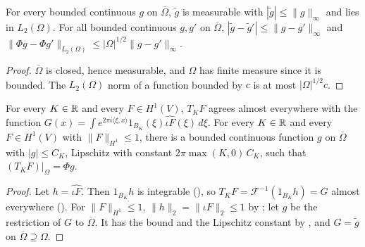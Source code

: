 \begin{lemma}
\label{lem:closure-extension}
\leanok
{}
For every bounded continuous $g$ on $\overline \Omega$, $\tilde g$ is measurable with
$|\tilde g| \leq \|g\|_\infty$ and lies in $L_2(\Omega)$. For all bounded continuous $g, g'$ on
$\overline \Omega$, $|\tilde g - \tilde g'| \leq \|g - g'\|_\infty$ and
$\|\Phi g - \Phi g'\|_{L_2(\Omega)} \leq |\Omega|^{1/2} \|g - g'\|_\infty$.
\end{lemma}

\begin{proof}
\leanok
$\overline \Omega$ is closed, hence measurable, and $\Omega$ has finite measure since it is
bounded. The $L_2(\Omega)$ norm of a function bounded by $c$ is at most $|\Omega|^{1/2} c$.
\end{proof}

\begin{lemma}
\label{lem:truncation-restriction-image}
\leanok
{}
For every $K \in \mathbb{R}$ and every $F \in H^1(V)$, $T_K F$ agrees almost everywhere with the function
$G(x) = \int e^{2 \pi i \langle \xi, x \rangle} 1_{B_K}(\xi) \widehat{\iota F}(\xi) \, d\xi$.
For every $K \in \mathbb{R}$ and every $F \in H^1(V)$ with $\|F\|_{H^1} \leq 1$, there is a bounded
continuous function $g$ on $\overline \Omega$ with $|g| \leq C_K$, Lipschitz with constant
$2 \pi \max(K, 0) \, C_K$, such that $(T_K F)|_\Omega = \Phi g$.
\end{lemma}

\begin{proof}
\leanok
Let $h = \widehat{\iota F}$. Then $1_{B_K} h$ is integrable (),
so $T_K F = \mathcal F^{-1}(1_{B_K} h) = G$ almost everywhere ().
For $\|F\|_{H^1} \leq 1$, $\|h\|_2 = \|\iota F\|_2 \leq 1$ by ; let
$g$ be the restriction of $G$ to $\overline \Omega$. It has the bound and the Lipschitz constant
by , and $G = \tilde g$ on $\overline \Omega \supseteq \Omega$.
\end{proof}

